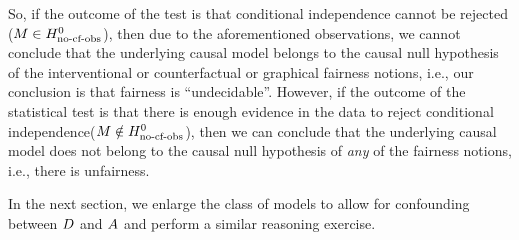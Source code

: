 So, if the outcome of the test is that conditional independence cannot be rejected ($M \in H^0_{\text{no-cf-obs}}$), then due to the aforementioned observations, we cannot conclude that the underlying causal model belongs to the causal null hypothesis of the interventional or counterfactual or graphical fairness notions, i.e., our conclusion is that fairness is ``undecidable''. However, if the outcome of the statistical test is that there is enough evidence in the data to reject conditional independence($M \notin H^0_{\text{no-cf-obs}}$), then we can conclude that the underlying causal model does not belong to the causal null hypothesis of \textit{any} of the fairness notions, i.e., there is unfairness. 

In the next section, we enlarge the class of models to allow for confounding between $D$ and $A$ and perform a similar reasoning exercise. 





